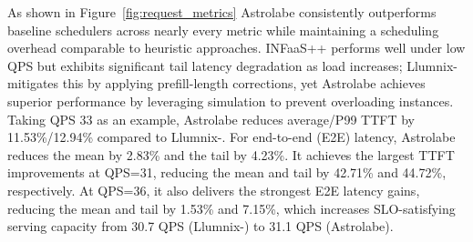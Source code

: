 \documentclass[sigconf, review, anonymous]{acmart}
\begin{document}

As shown in Figure~\ref{fig:request_metrics} Astrolabe consistently outperforms baseline schedulers across nearly every metric while maintaining a scheduling overhead comparable to heuristic approaches. INFaaS++ performs well under low QPS but exhibits significant tail latency degradation as load increases; Llumnix- mitigates this by applying prefill-length corrections, yet Astrolabe achieves superior performance by leveraging simulation to prevent overloading instances. Taking QPS 33 as an example, Astrolabe reduces average/P99 TTFT by 11.53\%/12.94\% compared to Llumnix-. For end-to-end (E2E) latency, Astrolabe reduces the mean by 2.83\% and the tail by 4.23\%. It achieves the largest TTFT improvements at QPS=31, reducing the mean and tail by 42.71\% and 44.72\%, respectively. At QPS=36, it also delivers the strongest E2E latency gains, reducing the mean and tail by 1.53\% and 7.15\%, which increases SLO-satisfying serving capacity from 30.7 QPS (Llumnix-) to 31.1 QPS (Astrolabe).
\end{document}
